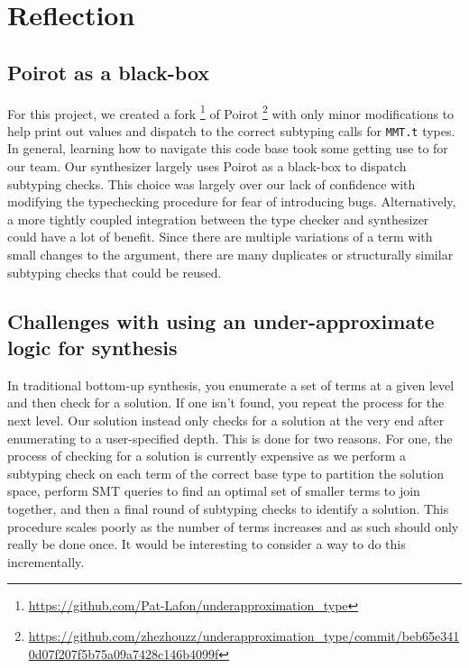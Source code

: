 \documentclass[review, sigplan]{acmart}
\begin{document}
\section{Reflection}

\subsection{Poirot as a black-box}
For this project, we created a fork
\footnote{\url{https://github.com/Pat-Lafon/underapproximation_type}} of Poirot
\footnote{\url{https://github.com/zhezhouzz/underapproximation_type/commit/beb65e3410d07f207f5b75a09a7428c146b4099f}}
with only minor modifications to help print out values and dispatch to the
correct subtyping calls for \lstinline|MMT.t| types. In general, learning how to
navigate this code base took some getting use to for our team. Our synthesizer
largely uses Poirot as a black-box to dispatch subtyping checks. This choice was
largely over our lack of confidence with modifying the typechecking procedure
for fear of introducing bugs. Alternatively, a more tightly coupled integration
between the type checker and synthesizer could have a lot of benefit. Since
there are multiple variations of a term with small changes to the argument,
there are many duplicates or structurally similar subtyping checks that could
be reused.

\subsection{Challenges with using an under-approximate logic for synthesis}
In traditional bottom-up synthesis, you enumerate a set of terms at a given
level and then check for a solution. If one isn't found, you repeat the process
for the next level. Our solution instead only checks for a solution at the very
end after enumerating to a user-specified depth. This is done for two reasons.
For one, the process of checking for a solution is currently expensive as we
perform a subtyping check on each term of the correct base type to partition the
solution space, perform SMT queries to find an optimal set of smaller terms to
join together, and then a final round of subtyping checks to identify a
solution. This procedure scales poorly as the number of terms increases and as
such should only really be done once. It would be interesting to consider a way
to do this incrementally.
\end{document}
